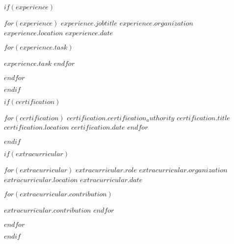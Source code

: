 \documentclass[11pt, a4paper]{awesome-cv}
\begin{document}
    $if(experience)$

    \begin{cventries}
        $for(experience)$
        \cventry
        {$experience.jobtitle$}
        {$experience.organization$}
        {$experience.location$}
        {$experience.date$}
        {
        \begin{cvitems}
            $for(experience.task)$
            \item {$experience.task$}
            $endfor$
        \end{cvitems}
        }
        $endfor$
    \end{cventries}
    $endif$


    $if(certification)$

    \begin{cventries}
        $for(certification)$
        \cventry
        {$certification.certification_authority$}
        {$certification.title$}
        {$certification.location$}
        {$certification.date$}
        {}
        $endfor$
    \end{cventries}
    $endif$


    $if(extracurricular)$

    \begin{cventries}
        $for(extracurricular)$
        \cventry
        {$extracurricular.role$} %
        {$extracurricular.organization$} %
        {$extracurricular.location$} %
        {$extracurricular.date$} %
        {
        \begin{cvitems}
            $for(extracurricular.contribution)$
            \item {$extracurricular.contribution$}
            $endfor$
        \end{cvitems}
        }
        $endfor$
    \end{cventries}
    $endif$

\end{document}
